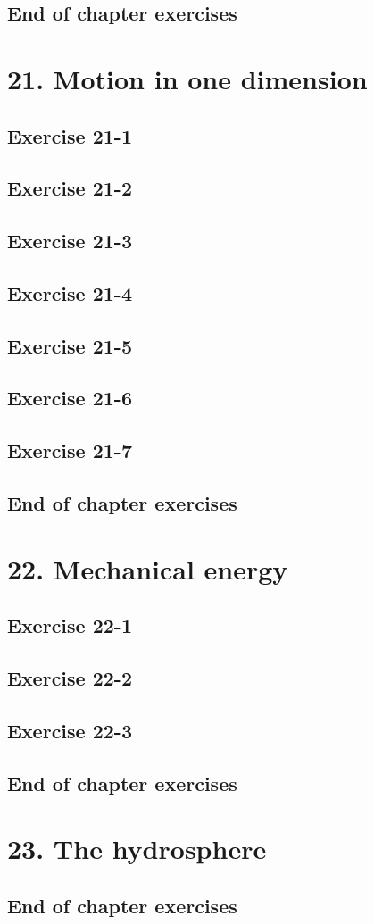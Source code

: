 \subsection{End of chapter exercises}
\section{21. Motion in one dimension}
\subsection{Exercise 21-1}
\subsection{Exercise 21-2}
\subsection{Exercise 21-3}
\subsection{Exercise 21-4}
\subsection{Exercise 21-5}
\subsection{Exercise 21-6}
\subsection{Exercise 21-7}
\subsection{End of chapter exercises}
\section{22. Mechanical energy}
\subsection{Exercise 22-1}
\subsection{Exercise 22-2}
\subsection{Exercise 22-3}
\subsection{End of chapter exercises}
\section{23. The hydrosphere}
\subsection{End of chapter exercises}